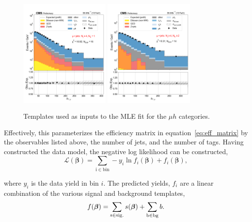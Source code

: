\begin{figure}[htb!]
    \centering
    \includegraphics[width=0.4\textwidth]{chapters/Analysis/sectionStatisticalAnalysis/figures/fit/mujet_cat_gt4_eq1}
    \includegraphics[width=0.4\textwidth]{chapters/Analysis/sectionStatisticalAnalysis/figures/fit/mujet_cat_gt4_gt2}
    \caption{Templates used as inputs to the MLE fit for the $\mu h$ categories.}
    \label{fig:mle_templates_mu4j}
\end{figure}


Effectively, this parameterizes the efficiency matrix in
equation~\ref{eq:eff_matrix} by the observables listed above, the number
of jets, and the number of \PQb tags.  Having constructed the data model,
the negative log likelihood can be constructed,
\begin{equation}
\label{eq:nll}
\mathcal{L}(\boldsymbol{\beta}) = \sum_{\mathrm{i\in bin}} -y_{i}\ln
f_{i}(\boldsymbol{\beta}) + f_{i}(\boldsymbol{\beta}),
\end{equation}

where $y_{i}$ is the data yield in bin $i$.  The predicted yields,
$f_{i}$ are a linear combination of the various signal and background
templates, 
\begin{equation}
    f(\boldsymbol{\beta}) = \sum_{\rm s \in
    sig.}s(\boldsymbol{\beta}) + \sum_{\rm b\in bg} b.
\end{equation}

